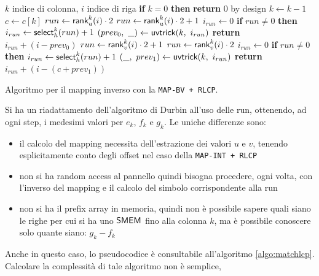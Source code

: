 \begin{algorithm}
  \begin{algorithmic}[1]
    \Comment $k$ indice di colonna, $i$ indice di riga
    \State \textbf{if} $k=0$ \textbf{then} \textbf{return} $0$
    \Comment by design
    \State $k\gets k-1$
    \State $c\gets c[k]$
    \State $run\gets \mbox{\rm {\sf rank}}_u^{k}(i)\cdot 2$
    \Else
    \State $run\gets \mbox{\rm {\sf rank}}_u^{k}(i)\cdot 2+1$
    \EndIf
    \State $i_{run}\gets 0$
    \State \textbf{if} $run\neq 0$ \textbf{then} $i_{run}\gets
    \mbox{\rm {\sf select}}_h^{k}(run)+1$ 
    \State $(prev_0,\,\,\_)\gets \mbox{\rm {\sf uvtrick}}(k,\,\,i_{run})$
    \State \textbf{return} $i_{run}+(i-prev_0)$
    \Else
    \State $run\gets \mbox{\rm {\sf rank}}_v^{k}(i)\cdot 2+1$
    \Else
    \State $run\gets \mbox{\rm {\sf rank}}_v^{k}(i)\cdot 2$
    \EndIf
    \State $i_{run}\gets 0$
    \State \textbf{if} $run\neq 0$ \textbf{then} $i_{run}\gets
    \mbox{\rm {\sf select}}_h^{k}(run)+1$ 
    \State $(\_,\,\,prev_1)\gets \mbox{\rm {\sf uvtrick}}(k,\,\,i_{run})$
    \State \textbf{return} $i_{run}+(i-(c+prev_1))$
    \EndIf
    \EndFunction
  \end{algorithmic}
  \caption{Algoritmo per il mapping inverso con la \texttt{MAP-BV + RLCP}.}
  \label{algo:lfrevbv}
\end{algorithm}
\noindent
Si ha un riadattamento dell'algoritmo di Durbin all'uso delle
run, 
ottenendo, ad ogni step, i medesimi valori per $e_k$, $f_k$ e $g_k$. Le uniche
differenze sono:
\begin{itemize}
  \item il calcolo del mapping necessita dell'estrazione dei valori $u$ e $v$,
  tenendo esplicitamente conto degli offset nel caso della \texttt{MAP-INT +
    RLCP} 
  \item non si ha random access al pannello quindi bisogna procedere,
  ogni volta, con l'inverso del mapping e il calcolo del simbolo corrispondente
  alla run 
  \item non si ha il prefix array in memoria, quindi non è possibile
  sapere quali siano le righe per cui si ha uno $\mbox{\rm {\sf SMEM}}$ fino alla colonna
  $k$, ma è possibile conoscere solo quante siano: $g_k-f_k$
\end{itemize}
Anche in questo caso, lo pseudocodice è consultabile all'algoritmo
\ref{algo:matchlcp}. Calcolare la complessità di tale algoritmo non è semplice,

